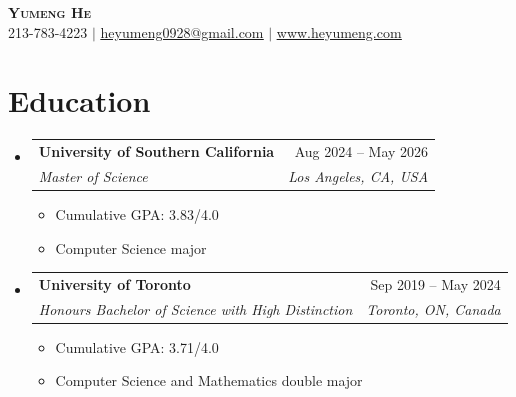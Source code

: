 \documentclass[letterpaper,11pt]{article}
\newcommand{\resumeItem}[1]{
  \item\small{
    {#1 \vspace{-2pt}}
  }
}
\newcommand{\resumeSubheading}[4]{
  \vspace{-2pt}\item
    \begin{tabularx}{\textwidth}[t]{X r}
      \textbf{#1} & #2 \\
      \textit{\small#3} & \textit{\small #4} \\
    \end{tabularx}\vspace{-7pt}
}
\newcommand{\resumeSubHeadingListStart}{\begin{itemize}[leftmargin=0in, label={}]}
\newcommand{\resumeSubHeadingListEnd}{\end{itemize}}
\newcommand{\resumeItemListStart}{\begin{itemize}}
\newcommand{\resumeItemListEnd}{\end{itemize}\vspace{-5pt}}
\begin{document}

\begin{center}
    \textbf{\Huge \scshape Yumeng He} \\ \vspace{1pt}
    \small 213-783-4223 $|$ \href{mailto:heyumeng0928@gmail.com}{\underline{heyumeng0928@gmail.com}} $|$ 
    \href{https://www.heyumeng.com} 
    {\underline{www.heyumeng.com}}
\end{center}


\section{Education}
  \resumeSubHeadingListStart
    \resumeSubheading
      {University of Southern California}{Aug 2024 -- May 2026}
      {Master of Science}{Los Angeles, CA, USA}
      \resumeItemListStart
        \resumeItem{Cumulative GPA: 3.83/4.0}
        \resumeItem{Computer Science major}
      \resumeItemListEnd
    \resumeSubheading
      {University of Toronto}{Sep 2019 -- May 2024}
      {Honours Bachelor of Science with High Distinction}{Toronto, ON, Canada}
      \resumeItemListStart
        \resumeItem{Cumulative GPA: 3.71/4.0}
        \resumeItem{Computer Science and Mathematics double major}
      \resumeItemListEnd
  \resumeSubHeadingListEnd
\end{document}

